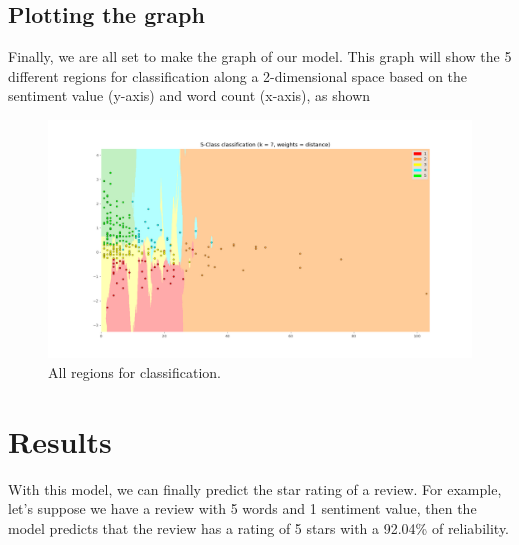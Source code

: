 \documentclass[10pt]{article}
\begin{document}
\subsection{Plotting the graph}
Finally, we are all set to make the graph of our model. This graph will show the 5 different regions for classification along a 2-dimensional space based on the sentiment value (y-axis) and word count (x-axis), as shown
\begin{figure}[h]
    \centering
    \includegraphics[width=130mm]{color_graph_k7.png}
    \caption{All regions for classification.}
\end{figure}

\section{Results}
With this model, we can finally predict the star rating of a review. For example, let's suppose we have a review with 5 words and 1 sentiment value, then the model predicts that the review has a rating of 5 stars with a 92.04\% of reliability.
\end{document}
